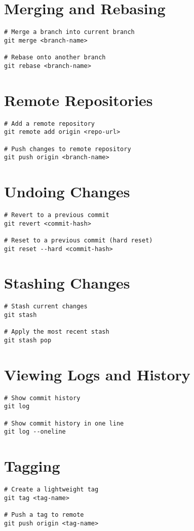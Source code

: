 \documentclass{article}
\begin{document}
\section{Merging and Rebasing}
\begin{lstlisting}
# Merge a branch into current branch
git merge <branch-name>

# Rebase onto another branch
git rebase <branch-name>
\end{lstlisting}

\section{Remote Repositories}
\begin{lstlisting}
# Add a remote repository
git remote add origin <repo-url>

# Push changes to remote repository
git push origin <branch-name>
\end{lstlisting}

\section{Undoing Changes}
\begin{lstlisting}
# Revert to a previous commit
git revert <commit-hash>

# Reset to a previous commit (hard reset)
git reset --hard <commit-hash>
\end{lstlisting}

\section{Stashing Changes}
\begin{lstlisting}
# Stash current changes
git stash

# Apply the most recent stash
git stash pop
\end{lstlisting}

\section{Viewing Logs and History}
\begin{lstlisting}
# Show commit history
git log

# Show commit history in one line
git log --oneline
\end{lstlisting}

\section{Tagging}
\begin{lstlisting}
# Create a lightweight tag
git tag <tag-name>

# Push a tag to remote
git push origin <tag-name>
\end{lstlisting}
\end{document}

